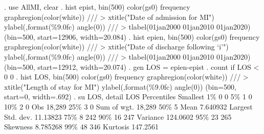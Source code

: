 . use AllMI, clear
{\smallskip}
. hist epist, bin(500) color(gs0) frequency graphregion(color(white)) ///
> xtitle("Date of admission for MI") ylabel(,format(\%9.0fc) angle(0)) ///
> tlabel(01jan2000 01jan2010 01jan2020)
(bin=500, start=12906, width=20.084)
{\smallskip}
. hist epien, bin(500) color(gs0) frequency graphregion(color(white)) ///
> xtitle("Date of discharge following `i'") ylabel(,format(\%9.0fc) angle(0)) ///
> tlabel(01jan2000 01jan2010 01jan2020)
(bin=500, start=12912, width=20.074)
{\smallskip}
. gen LOS = epien-epist
{\smallskip}
. count if LOS < 0
  0
{\smallskip}
. hist LOS, bin(500) color(gs0) frequency graphregion(color(white)) ///
> xtitle("Length of stay for MI") ylabel(,format(\%9.0fc) angle(0))
(bin=500, start=0, width=.692)
{\smallskip}
. su LOS, detail
{\smallskip}
                             LOS
      Percentiles      Smallest
 1\%            0              0
 5\%            1              0
10\%            2              0       Obs              18,289
25\%            3              0       Sum of wgt.      18,289
{\smallskip}
50\%            5                      Mean           7.640932
                        Largest       Std. dev.      11.13823
75\%            8            242
90\%           16            247       Variance       124.0602
95\%           23            265       Skewness       8.785268
99\%           48            346       Kurtosis       147.2561
{\smallskip}
